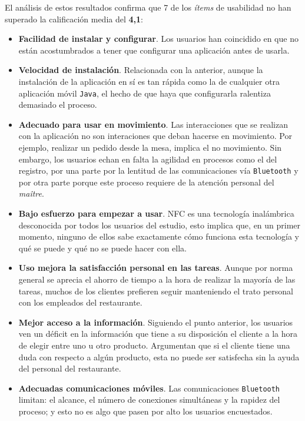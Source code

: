 El análisis de estos resultados confirma que 7 de los \emph{ítems} de 
usabilidad no han superado la calificación media del \textbf{4,1}:
\begin{itemize}
\item \textbf{Facilidad de instalar y configurar}. Los usuarios han coincidido
en que no están acostumbrados a tener que configurar una aplicación antes de
usarla.
\item \textbf{Velocidad de instalación}. Relacionada con la anterior, aunque
la instalación de la aplicación en sí es tan rápida como la de cualquier otra
aplicación móvil \texttt{Java}, el hecho de que haya que configurarla
ralentiza demasiado el proceso.
\item \textbf{Adecuado para usar en movimiento}. Las interacciones que se
realizan con la aplicación no son interaciones que deban hacerse en movimiento.
Por ejemplo, realizar un pedido desde la mesa, implica el no movimiento. Sin
embargo, los usuarios echan en falta la agilidad en procesos como el del
registro, por una parte por la lentitud de las comunicaciones vía
\texttt{Bluetooth} y por otra parte porque este proceso requiere de la atención
personal del \emph{maître}.
\item \textbf{Bajo esfuerzo para empezar a usar}. \acs{NFC} es una tecnología
inalámbrica desconocida por todos los usuarios del estudio, esto implica que,
en un primer momento, ninguno de ellos sabe exactamente cómo funciona esta
tecnología y qué se puede y qué no se puede hacer con ella.
\item \textbf{Uso mejora la satisfacción personal en las tareas}. Aunque por
norma general se aprecia el ahorro de tiempo a la hora de realizar la mayoría
de las tareas, muchos de los clientes prefieren seguir manteniendo el trato
personal con los empleados del restaurante.
\item \textbf{Mejor acceso a la información}. Siguiendo el punto anterior, los
usuarios ven un déficit en la información que tiene a su disposición el cliente
a la hora de elegir entre uno u otro producto. Argumentan que si el cliente
tiene una duda con respecto a algún producto, esta no puede ser satisfecha
sin la ayuda del personal del restaurante.
\item \textbf{Adecuadas comunicaciones móviles}. Las comunicaciones
\texttt{Bluetooth} limitan: el alcance, el número de conexiones simultáneas y
la rapidez del proceso; y esto no es algo que pasen por alto los usuarios
encuestados.
\end{itemize}

